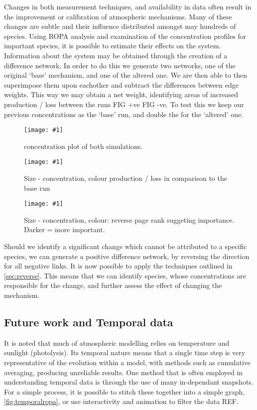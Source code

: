 \documentclass[twoside,reqno]{article}
\newcommand{\ch}[1]{\MakeUppercase{\ce{#1}}}  %
\newcommand{\qfig}[4]{\begin{figure}[H]\centering\texttt{[image: \#1]}\caption{#3}\label{#2}\end{figure}\newpage}
\begin{document}
Changes in both measurement techniques, and availability in data often result in the improvement or calibration of atmospheric mechanisms. Many of these changes are subtle and their influence distributed amongst may hundreds of species. Using ROPA analysis and examination of the concentration profiles for important species, it is possible to estimate their effects on the system. \\

Information about the system may be obtained through the creation of a difference network. In order to do this we generate two networks, one of the original `base' mechanism, and one of the altered one. We are then able to then superimpose them upon eachother and subtract the differences between edge weights. This way we may obtain a net weight, identifying areas of increased production / loss between the runs FIG +ve FIG -ve.
To test this we keep our previous concentrations as the `base' run, and double the \ch{NOx} for the `altered' one.\\

\qfig{newfigs/.pdf}{fig:diffcp}{concentration plot of both simulations.}{.5\textwidth}

\qfig{newfigs/ch2_difference_concentration.pdf}{fig:diffc}{Size - concentration, colour production / loss in comparison to the base run}{\textwidth}

\qfig{newfigs/ch2_difference_plot.pdf}{fig:diffplot}{Size - concentration, colour: reverse page rank suggeting importance. Darker = more important. }{\textwidth}

Should we identify a significant change which cannot be attributed to a specific species, we can generate a positive difference network, by reversing the direction for all negative links. It is now possible to apply the techniques outlined in \autoref{sec:reverse}. This means that we can identify species, whose concentrations are responsible for the change, and further assess the effect of changing the mechanism.

\subsection{Future work and Temporal data}

It is noted that much of atmospheric modelling relies on temperature and sunlight (photolysis). Its temporal nature means that a single time step is very representative of the evolution within a model, with methods such as cumulative averaging, producing unreliable results. One method that is often employed in understanding temporal data is through the use of many in-dependant snapshots. For a simple process, it is possible to stitch these together into a simple graph, \autoref{fig:temporalropa}, or use interactivity and animation to filter the data REF. \\
\end{document}
